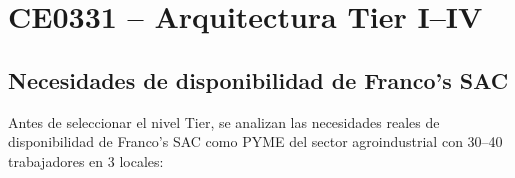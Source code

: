 \documentclass[11pt, a4paper, oneside]{report}
\begin{document}
\newpage
\pagestyle{fancy}
\tableofcontents
\clearpage
{}

\newpage
\pagestyle{fancy}


\chapter{CE0331 -- Arquitectura Tier I--IV}


\section{Necesidades de disponibilidad de Franco's SAC}

Antes de seleccionar el nivel Tier, se analizan las necesidades reales de disponibilidad de Franco's SAC como PYME del sector agroindustrial con 30--40 trabajadores en 3 locales:

\renewcommand{\arraystretch}{1.3}
\footnotesize
{}
\end{document}
